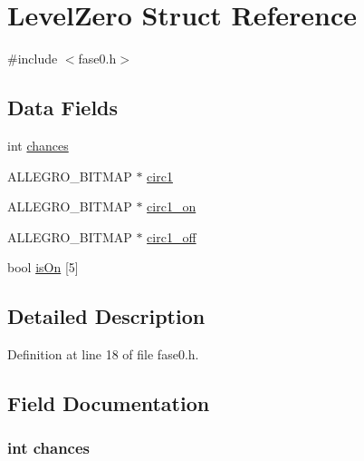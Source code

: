 \hypertarget{struct_level_zero}{\section{Level\-Zero Struct Reference}
\label{struct_level_zero}
}


{\ttfamily \#include $<$fase0.\-h$>$}

\subsection*{Data Fields}
\begin{DoxyCompactItemize}
\item 
int \hyperlink{struct_level_zero_a654217f8a02c11b0a494d8db3c912d7a}{chances}
\item 
A\-L\-L\-E\-G\-R\-O\-\_\-\-B\-I\-T\-M\-A\-P $\ast$ \hyperlink{struct_level_zero_a9877f31790b6d2f38fb468a9448223f1}{circ1}
\item 
A\-L\-L\-E\-G\-R\-O\-\_\-\-B\-I\-T\-M\-A\-P $\ast$ \hyperlink{struct_level_zero_a15699608afb18fad793848cd8fd32fe0}{circ1\-\_\-on}
\item 
A\-L\-L\-E\-G\-R\-O\-\_\-\-B\-I\-T\-M\-A\-P $\ast$ \hyperlink{struct_level_zero_a61973bafd11ab9dea9306731297f4728}{circ1\-\_\-off}
\item 
bool \hyperlink{struct_level_zero_a59f6fe985ed5513f62660b2926c812aa}{is\-On} \mbox{[}5\mbox{]}
\end{DoxyCompactItemize}


\subsection{Detailed Description}


Definition at line 18 of file fase0.\-h.



\subsection{Field Documentation}
\hypertarget{struct_level_zero_a654217f8a02c11b0a494d8db3c912d7a}{
\subsubsection[{chances}]{\setlength{\rightskip}{0pt plus 5cm}int chances}}\label{struct_level_zero_a654217f8a02c11b0a494d8db3c912d7a}


